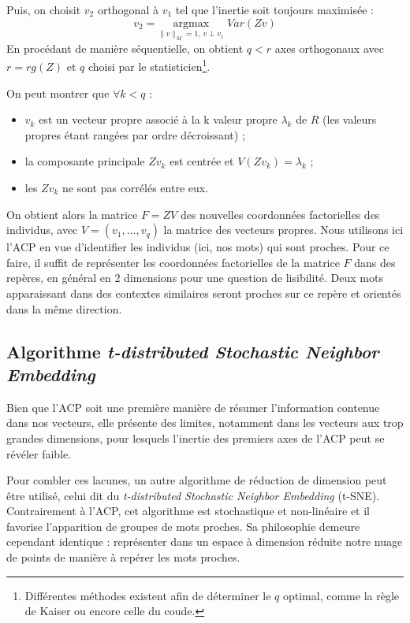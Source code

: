 \documentclass[11pt,french,french]{article}
\providecommand{\tightlist}{%
  \setlength{\parskip}{0pt}
  }
\let\rmarkdownfootnote\footnote%
\def\footnote{\protect\rmarkdownfootnote}
\begin{document}
Puis, on choisit \(v_2\) orthogonal à \(v_1\) tel que l'inertie soit
toujours maximisée : \[
v_2 =\underset{ \| v \|_M = 1,\,v \perp v_1}{\mathrm{argmax}}\;  Var(Zv)
\] En procédant de manière séquentielle, on obtient \(q < r\) axes
orthogonaux avec \(r = rg(Z)\) et \(q\) choisi par le
statisticien\footnote{Différentes méthodes existent afin de déterminer
  le \(q\) optimal, comme la règle de Kaiser ou encore celle du coude.}.

On peut montrer que \(\forall k < q\) :

\begin{itemize}
\tightlist
\item
  \(v_k\) est un vecteur propre associé à la k\ieme{} valeur propre
  \(\lambda_k\) de \(R\) (les valeurs propres étant rangées par ordre
  décroissant) ;
\item
  la composante principale \(Zv_k\) est centrée et
  \(V(Zv_k)= \lambda_k\) ;
\item
  les \(Zv_k\) ne sont pas corrélés entre eux.
\end{itemize}

On obtient alors la matrice \(F = ZV\) des nouvelles coordonnées
factorielles des individus, avec \(V = (v_1,\dots,v_q)\) la matrice des
vecteurs propres. Nous utilisons ici l'ACP en vue d'identifier les
individus (ici, nos mots) qui sont proches. Pour ce faire, il suffit de
représenter les coordonnées factorielles de la matrice \(F\) dans des
repères, en général en 2 dimensions pour une question de lisibilité.
Deux mots apparaissant dans des contextes similaires seront proches sur
ce repère et orientés dans la même direction.

\subsection{\texorpdfstring{Algorithme \emph{t-distributed Stochastic
Neighbor
Embedding}}{Algorithme t-distributed Stochastic Neighbor Embedding}}\label{algorithme-t-distributed-stochastic-neighbor-embedding}

Bien que l'ACP soit une première manière de résumer l'information
contenue dans nos vecteurs, elle présente des limites, notamment dans
les vecteurs aux trop grandes dimensions, pour lesquels l'inertie des
premiers axes de l'ACP peut se révéler faible.

Pour combler ces lacunes, un autre algorithme de réduction de dimension
peut être utilisé, celui dit du \emph{t-distributed Stochastic Neighbor
Embedding} (t-SNE). Contrairement à l'ACP, cet algorithme est
stochastique et non-linéaire et il favorise l'apparition de groupes de
mots proches. Sa philosophie demeure cependant identique : représenter
dans un espace à dimension réduite notre nuage de points de manière à
repérer les mots proches.
\end{document}
